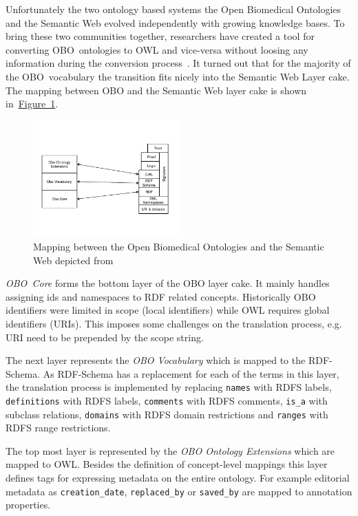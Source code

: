 \documentclass[draft,final]{vutinfth} %
\begin{document}
Unfortunately the two ontology based systems the Open Biomedical Ontologies and the Semantic Web evolved independently with growing knowledge bases. To bring these two communities together, researchers have created a tool for converting OBO~ontologies to OWL and vice-versa without loosing any information during the conversion process~\cite{tirmizi2011}. It turned out that for the majority of the OBO~vocabulary the transition fits nicely into the Semantic Web Layer cake. The mapping between OBO and the Semantic Web layer cake is shown in~\hyperref[fig:semantic_obo_cake]{Figure~\ref*{fig:semantic_obo_cake}}. 

\begin{figure}
	 \centering
	 \includegraphics[width=0.5\textwidth]{drawio/Obo2Owl}
	 \caption{Mapping between the Open Biomedical Ontologies and the Semantic Web depicted from~\cite{tirmizi2011}}\label{fig:semantic_obo_cake}
\end{figure}

\emph{OBO~Core} forms the bottom layer of the OBO layer cake. It mainly handles assigning ids and namespaces to RDF related concepts. Historically OBO identifiers were limited in scope (local identifiers) while OWL requires global identifiers (URIs). This imposes some challenges on the translation process, e.g. URI need to be prepended by the scope string. 

The next layer represents the \emph{OBO Vocabulary} which is mapped to the RDF-Schema. As RDF-Schema has a replacement for each of the terms in this layer, the translation process is implemented by replacing \texttt{names} with RDFS labels, \texttt{definitions} with RDFS labels, \texttt{comments} with RDFS comments, \texttt{is\_a} with subclass relations, \texttt{domains} with RDFS domain restrictions and \texttt{ranges} with RDFS range restrictions. 

The top most layer is represented by the \emph{OBO Ontology Extensions} which are mapped to OWL. Besides the definition of concept-level mappings this layer defines tags for expressing metadata on the entire ontology. For example editorial metadata as \texttt{creation\_date}, \texttt{replaced\_by} or \texttt{saved\_by} are mapped to annotation properties. 
\end{document}
